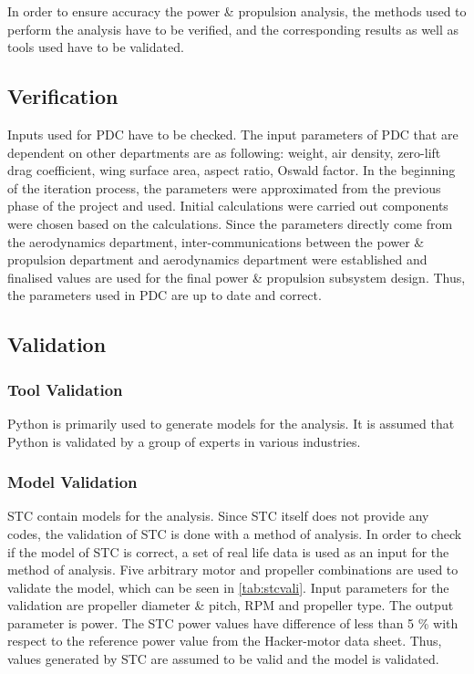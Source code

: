 {In order to ensure accuracy the power \& propulsion analysis, the methods used to perform the analysis have to be verified, and the corresponding results as well as tools used have to be validated.
\subsection{Verification}
Inputs used for PDC have to be checked. The input parameters of PDC that are dependent on other departments are as following: weight, air density, zero-lift drag coefficient, wing surface area, aspect ratio, Oswald factor. In the beginning of the iteration process, the parameters were approximated from the previous phase of the project and used. Initial calculations were carried out components were chosen based on the calculations. Since the parameters directly come from the aerodynamics department, inter-communications between the power \& propulsion department  and aerodynamics department were established and finalised values are used for the final power \& propulsion subsystem design. Thus, the parameters used in PDC are up to date and correct.

\subsection{Validation}
\subsubsection*{Tool Validation}
Python is primarily used to generate models for the analysis. It is assumed that Python is validated by a group of experts in various industries.

\subsubsection*{Model Validation}
STC contain models for the analysis. Since STC itself does not provide any codes, the validation of STC is done with a method of analysis. In order to check if the model of STC is correct, a set of real life data is used as an input for the method of analysis. Five arbitrary motor and propeller combinations are used to validate the model, which can be seen in \autoref{tab:stcvali}. Input parameters for the validation are propeller diameter \& pitch, RPM and propeller type. The output parameter is power. The STC power values have difference of less than 5 \% with respect to the reference power value from the Hacker-motor data sheet.\cite{hackerdata} Thus, values generated by STC are assumed to be valid and the model is validated.

}
